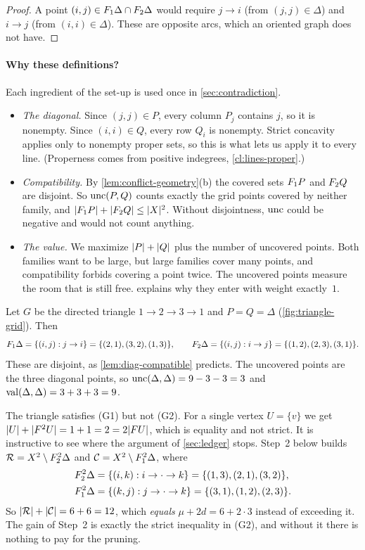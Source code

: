 \begin{proof}
A point $(i,j)\in F_1\Delta\cap F_2\Delta$ would require $j\to i$ (from
$(j,j)\in\Delta$) and $i\to j$ (from $(i,i)\in\Delta$). These are opposite
arcs, which an oriented graph does not have.
\end{proof}

\paragraph{Why these definitions?}
Each ingredient of the set-up is used once in \cref{sec:contradiction}.
\begin{itemize}[leftmargin=*]
\item \emph{The diagonal.} Since $(j,j)\in P$, every column $P_j$ contains
$j$, so it is nonempty. Since $(i,i)\in Q$, every row $Q_i$ is nonempty.
Strict concavity applies only to nonempty proper sets, so this is what lets
us apply it to every line. (Properness comes from positive indegrees,
\cref{cl:lines-proper}.)
\item \emph{Compatibility.} By \cref{lem:conflict-geometry}(b) the covered
sets $F_1 P$ and $F_2 Q$ are disjoint. So $\operatorname{unc}(P,Q)$ counts exactly the
grid points covered by neither family, and $\lvert F_1 P\rvert+\lvert F_2 Q\rvert\le\lvert X\rvert^2$.
Without disjointness, $\operatorname{unc}$ could be negative and would not count
anything.
\item \emph{The value.} We maximize $\lvert P\rvert+\lvert Q\rvert$ plus the number of
uncovered points. Both families want to be large, but large families cover
many points, and compatibility forbids covering a point twice. The
uncovered points measure the room that is still free. 
explains why they enter with weight exactly~$1$.
\end{itemize}

\begin{example}\label{ex:triangle-grid}
Let $G$ be the directed triangle $1\to2\to3\to1$ and $P=Q=\Delta$
(\cref{fig:triangle-grid}). Then
\[
 F_1\Delta=\{(i,j): j\to i\}=\{(2,1),(3,2),(1,3)\},\qquad
 F_2\Delta=\{(i,j): i\to j\}=\{(1,2),(2,3),(3,1)\}.
\]
These are disjoint, as \cref{lem:diag-compatible} predicts. The uncovered
points are the three diagonal points, so $\operatorname{unc}(\Delta,\Delta)=9-3-3=3$ and
$\operatorname{val}(\Delta,\Delta)=3+3+3=9$.

The triangle satisfies (G1) but not (G2). For a single vertex $U=\{v\}$
we get $\lvert U\rvert+\lvert F^2U\rvert=1+1=2=2\lvert FU\rvert$, which is equality and not strict.
It is instructive to see where the argument of \cref{sec:ledger} stops.
Step~2 below builds $\mathcal R=X^2\setminus F_2^2\Delta$ and
$\mathcal C=X^2\setminus F_1^2\Delta$, where
\begin{align*}
 F_2^2\Delta&=\{(i,k): i\to\cdot\to k\}=\{(1,3),(2,1),(3,2)\},\\
 F_1^2\Delta&=\{(k,j): j\to\cdot\to k\}=\{(3,1),(1,2),(2,3)\}.
\end{align*}
So $\lvert \mathcal R\rvert+\lvert \mathcal C\rvert=6+6=12$, which \emph{equals} $\mu+2d=6+2\cdot3$
instead of exceeding it. The gain of Step~2 is exactly the strict
inequality in (G2), and without it there is nothing to pay for the pruning.
\end{example}

